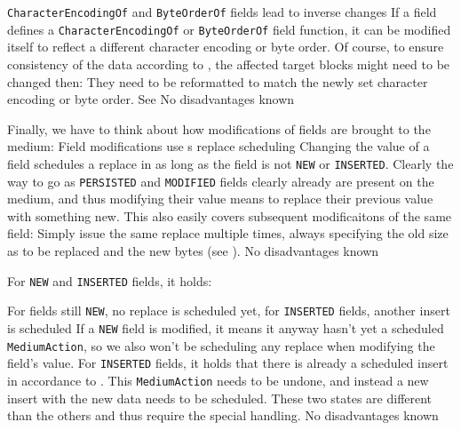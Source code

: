 {%
\texttt{CharacterEncodingOf} and \texttt{ByteOrderOf} fields lead to inverse changes
}
{%
If a field defines a \texttt{CharacterEncodingOf} or \texttt{ByteOrderOf} field function, it can be modified itself to reflect a different character encoding or byte order. Of course, to ensure consistency of the data according to , the affected target blocks might need to be changed then: They need to be reformatted to match the newly set character encoding or byte order.
}
{%
See 
}
{%
No disadvantages known
}

Finally, we have to think about how modifications of fields are brought to the medium:
{%
Field modifications use \COMPmedia{}s replace scheduling
}
{%
Changing the value of a field schedules a replace in \COMPmedia{} as long as the field is not \texttt{NEW} or \texttt{INSERTED}.
}
{%
Clearly the way to go as \texttt{PERSISTED} and \texttt{MODIFIED} fields clearly already are present on the medium, and thus modifying their value means to replace their previous value with something new. This also easily covers subsequent modificaitons of the same field: Simply issue the same replace multiple times, always specifying the old size as to be replaced and the new bytes (see ).
}
{%
No disadvantages known
}

For \texttt{NEW} and \texttt{INSERTED} fields, it holds:

{%
For fields still \texttt{NEW}, no replace is scheduled yet, for \texttt{INSERTED} fields, another insert is scheduled
}
{%
If a \texttt{NEW} field is modified, it means it anyway hasn't yet a scheduled \texttt{MediumAction}, so we also won't be scheduling any replace when modifying the field's value. For \texttt{INSERTED} fields, it holds that there is already a scheduled insert in accordance to . This \texttt{MediumAction} needs to be undone, and instead a new insert with the new data needs to be scheduled.
}
{%
These two states are different than the others and thus require the special handling.
}
{%
No disadvantages known
}

